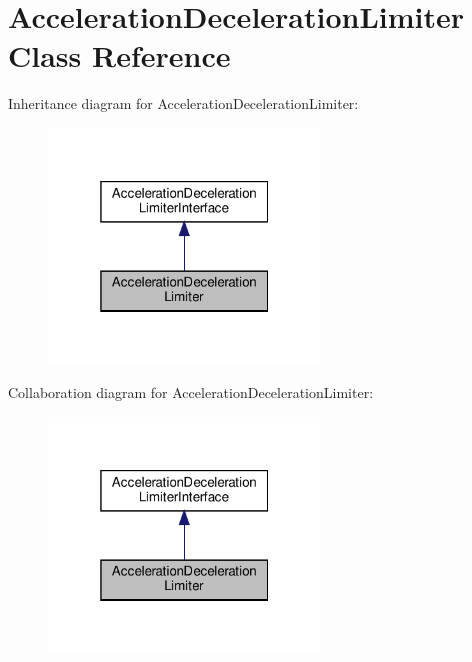 \hypertarget{classAccelerationDecelerationLimiter}{}\section{Acceleration\+Deceleration\+Limiter Class Reference}
\label{classAccelerationDecelerationLimiter}


Inheritance diagram for Acceleration\+Deceleration\+Limiter\+:
\nopagebreak
\begin{figure}[H]
\begin{center}
\leavevmode
\includegraphics[width=205pt]{classAccelerationDecelerationLimiter__inherit__graph}
\end{center}
\end{figure}


Collaboration diagram for Acceleration\+Deceleration\+Limiter\+:
\nopagebreak
\begin{figure}[H]
\begin{center}
\leavevmode
\includegraphics[width=205pt]{classAccelerationDecelerationLimiter__coll__graph}
\end{center}
\end{figure}

